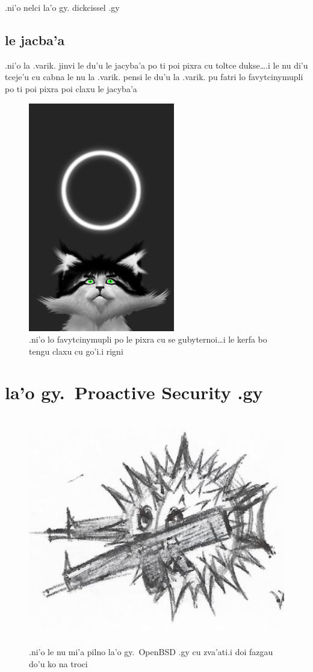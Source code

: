 \documentclass{report}
\begin{document}
.ni'o nelci la'o gy. dickcissel .gy
\section{le jacba'a}
.ni'o la .varik. jinvi le du'u le jacyba'a po ti poi pixra cu toltce dukse\ldots\@ .i le nu di'u tceje'u cu cabna le nu la .varik. pensi le du'u la .varik. pu fatri lo favytcinymupli po ti poi pixra poi claxu le jacyba'a
\begin{figure}[ht]
	\centering
	\includegraphics[height=10cm]{20200414042645-03/20200414042645-03-uw.png}
	\caption[center]{.ni'o lo favytcinymupli po le pixra cu se gubyternoi\ldots i le kerfa bo tengu claxu cu go'i\@  .i rigni}
\end{figure}
\chapter{la'o gy.\ Proactive Security .gy}
\begin{figure}[ht]
	\centering
	\includegraphics[height=10cm]{proactivesecurity/proactivesecurity.png}
	\caption[center]{.ni'o le nu mi'a pilno la'o gy.\ OpenBSD .gy cu zva'ati\@  .i doi fazgau do'u ko na troci}
\end{figure}
\end{document}

